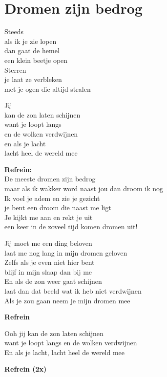 \section{Dromen zijn bedrog}
Steeds\\
als ik je zie lopen\\
dan gaat de hemel\\
een klein beetje open\\
Sterren\\
je laat ze verbleken\\
met je ogen die altijd stralen

Jij\\
kan de zon laten schijnen\\
want je loopt langs\\
en de wolken verdwijnen\\
en als je lacht\\
lacht heel de wereld mee

\textbf{Refrein:}\\
De meeste dromen zijn bedrog\\
maar als ik wakker word naast jou dan droom ik nog\\
Ik voel je adem en zie je gezicht\\
je bent een droom die naast me ligt\\
Je kijkt me aan en rekt je uit\\
een keer in de zoveel tijd komen dromen uit!

Jij moet me een ding beloven\\
laat me nog lang in mijn dromen geloven\\
Zelfs als je even niet hier bent\\
blijf in mijn slaap dan bij me\\
En als de zon weer gaat schijnen\\
laat dan dat beeld wat ik heb niet verdwijnen\\
Als je zou gaan neem je mijn dromen mee

\textbf{Refrein}

Ooh jij kan de zon laten schijnen\\
want je loopt langs en de wolken verdwijnen\\
En als je lacht, lacht heel de wereld mee

\textbf{Refrein (2x)}
